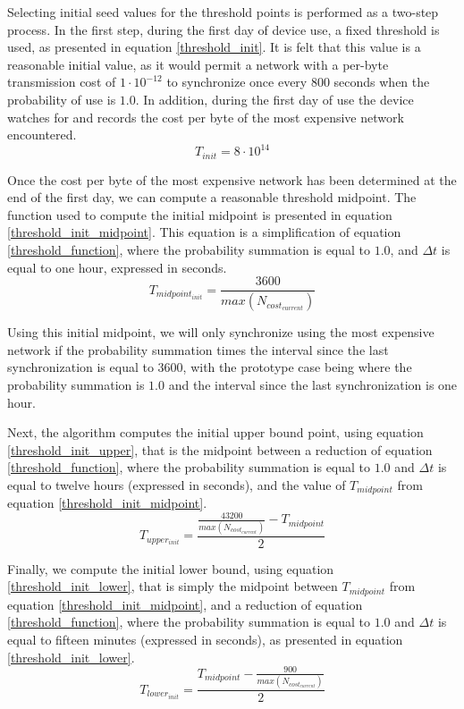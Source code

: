 Selecting initial seed values for the threshold points is performed as a two-step process.  In the first step, during the first day of device use, a fixed threshold is used, as presented in equation \ref{threshold_init}.  It is felt that this value is a reasonable initial value, as it would permit a network with a per-byte transmission cost of $1 \cdot 10^{-12}$ to synchronize once every 800 seconds when the probability of use is $1.0$.  In addition, during the first day of use the device watches for and records the cost per byte of the most expensive network encountered.
\begin{equation}
T_{init} = 8 \cdot 10^{14} \label{threshold_init}
\end{equation}

Once the cost per byte of the most expensive network has been determined at the end of the first day, we can compute a reasonable threshold midpoint.  The function used to compute the initial midpoint is presented in equation \ref{threshold_init_midpoint}.  This equation is a simplification of equation \ref{threshold_function}, where the probability summation is equal to $1.0$, and $\Delta t$ is equal to one hour, expressed in seconds.
\begin{equation}
T_{midpoint_{init}} = \frac{3600}{max(N_{cost_{current}})} \label{threshold_init_midpoint}
\end{equation}

Using this initial midpoint, we will only synchronize using the most expensive network if the probability summation times the interval since the last synchronization is equal to 3600, with the prototype case being where the probability summation is $1.0$ and the interval since the last synchronization is one hour.

Next, the algorithm computes the initial upper bound point, using equation \ref{threshold_init_upper}, that is the midpoint between a reduction of equation \ref{threshold_function}, where the probability summation is equal to $1.0$ and $\Delta t$ is equal to twelve hours (expressed in seconds), and the value of $T_{midpoint}$ from equation \ref{threshold_init_midpoint}.
\begin{equation}
T_{upper_{init}} = \frac{\displaystyle\frac{43200}{max(N_{cost_{current}})} - T_{midpoint}}{2} \label{threshold_init_upper}
\end{equation}

Finally, we compute the initial lower bound, using equation \ref{threshold_init_lower}, that is simply the midpoint between $T_{midpoint}$ from equation \ref{threshold_init_midpoint}, and a reduction of equation \ref{threshold_function}, where the probability summation is equal to $1.0$ and $\Delta t$ is equal to fifteen minutes (expressed in seconds), as presented in equation \ref{threshold_init_lower}.
\begin{equation}
T_{lower_{init}} = \frac{T_{midpoint} - \displaystyle\frac{900}{max(N_{cost_{current}})}}{2} \label{threshold_init_lower}
\end{equation}

